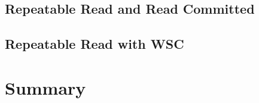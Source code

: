     \subsection{Repeatable Read and Read Committed}
    
    \subsection{Repeatable Read with WSC}

\section{Summary}


% 

